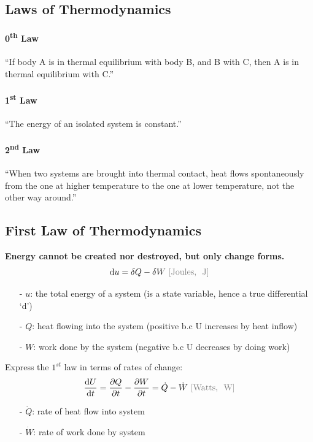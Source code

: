 \documentclass[12pt, a4paper]{article}
\numberwithin{equation}{subsection}
\begin{document}
\subsection{Laws of Thermodynamics}

\paragraph{0\textsuperscript{th} Law} ``If body A is in thermal equilibrium with body B, and B with C, then A is in thermal equilibrium with C.''

\paragraph{1\textsuperscript{st} Law} ``The energy of an isolated system is constant.''

\paragraph{2\textsuperscript{nd} Law} ``When two systems are brought into thermal contact, heat flows spontaneously from the one at higher temperature to the one at lower temperature, not the other way around.''

\subsection{First Law of Thermodynamics}
\textbf{Energy cannot be created nor destroyed, but only change forms.}
\[ 
    \mathrm{d}u = \delta Q - \delta W \  {\color{gray}[\text{Joules, \ J}]}  
\] 
\begin{itemize}
    \item[-] $u$: the total energy of a system (is a state variable, hence a true differential `d’)
    \item[-] $Q$: heat flowing into the system (positive b.c U increases by heat inflow) 
    \item[-] $W$: work done by the system (negative b.c U decreases by doing work)
\end{itemize}
 
Express the $1^{st}$ law in terms of rates of change:
\[ 
    \frac{\mathrm{d}U}{\mathrm{d}t} = \frac{\partial Q}{\partial t} - \frac{\partial W}{\partial t} = \dot{Q}-\dot{W} \ {\color{gray}[\text{Watts, \ W}]}  
\]
\begin{itemize}
    \item[-] \textbf{$\dot{Q}$}: rate of heat flow into system 
    \item[-] \textbf{$\dot{W}$}: rate of work done by system
\end{itemize}
 
\end{document}
